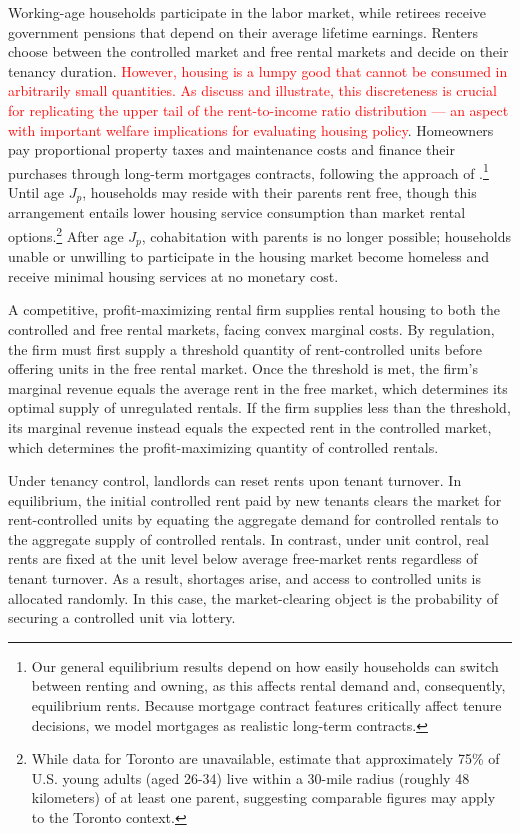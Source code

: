 \documentclass[parskip=full]{article}
\begin{document}
Working-age households participate in the labor market, while retirees receive government pensions that depend on their average lifetime earnings. Renters choose between the controlled market and free rental markets and decide on their tenancy duration. \textcolor{red}{However, housing is a lumpy good that cannot be consumed in arbitrarily small quantities. As \citet{rs-2023} discuss and illustrate, this discreteness is crucial for replicating the upper tail of the rent-to-income ratio distribution — an aspect with important welfare implications for evaluating housing policy}. Homeowners pay proportional property taxes and maintenance costs and finance their purchases through long-term mortgages contracts, following the approach of \citet{kkk-2021}.\footnote{Our general equilibrium results depend on how easily households can switch between renting and owning, as this affects rental demand and, consequently, equilibrium rents. Because mortgage contract features critically affect tenure decisions, we model mortgages as realistic long-term contracts.} Until age $J_{p}$, households may reside with their parents rent free, though this arrangement entails lower housing service consumption than market rental options.\footnote{While data for Toronto are unavailable, \citet{spatial_distance-2020} estimate that approximately 75\% of U.S. young adults (aged 26-34) live within a 30-mile radius (roughly 48 kilometers) of at least one parent, suggesting comparable figures may apply to the Toronto context.} After age $J_{p}$, cohabitation with parents is no longer possible; households unable or unwilling to participate in the housing market become homeless and receive minimal housing services at no monetary cost.

A competitive, profit-maximizing rental firm supplies rental housing to both the controlled and free rental markets, facing convex marginal costs. By regulation, the firm must first supply a threshold quantity of rent-controlled units before offering units in the free rental market. Once the threshold is met, the firm's marginal revenue equals the average rent in the free market, which determines its optimal supply of unregulated rentals. If the firm supplies less than the threshold, its marginal revenue instead equals the expected rent in the controlled market, which determines the profit-maximizing quantity of controlled rentals.

Under tenancy control, landlords can reset rents upon tenant turnover. In equilibrium, the initial controlled rent paid by new tenants clears the market for rent-controlled units by equating the aggregate demand for controlled rentals to the aggregate supply of controlled rentals. In contrast, under unit control, real rents are fixed at the unit level below average free-market rents regardless of tenant turnover. As a result, shortages arise, and access to controlled units is allocated randomly. In this case, the market-clearing object is the probability of securing a controlled unit via lottery.
\end{document}
